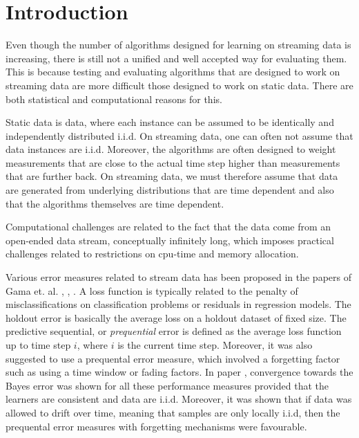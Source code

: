 \section{Introduction}

Even though the number of algorithms designed for learning on streaming data is increasing, there is still not a unified and well accepted way for evaluating them.  This is because testing and evaluating algorithms that are designed to work on streaming data are more difficult those designed to work on static data.  There are both statistical and computational reasons for this.  

Static data is data, where each instance can be assumed to be identically and independently distributed i.i.d.  On streaming data, one can often not assume that data instances are i.i.d.  Moreover, the algorithms are often designed to weight measurements that are close to the actual time step higher than measurements that are further back.  On streaming data, we must therefore assume that data are generated from underlying distributions that are time dependent and also that the algorithms themselves are time dependent.  

Computational challenges are related to the fact that the data come from an open-ended data stream, conceptually infinitely long, which imposes practical challenges related to restrictions on cpu-time and memory allocation.  

Various error measures related to stream data has been proposed in the papers of Gama et. al. \cite{Gam09}, \cite{Gam09_2}, \cite{Gam12}.  A loss function is typically related to the penalty of misclassifications on classification problems or residuals in regression models.  The holdout error is basically the average loss on a holdout dataset of fixed size.  The predictive sequential, or \emph{prequential} error is defined as the average loss function up to time step $i$, where $i$ is the current time step.  Moreover, it was also suggested to use a prequental error measure, which involved a forgetting factor such as using a time window or fading factors.  In paper \cite{Gam12}, convergence towards the Bayes error was shown for all these performance measures provided that the learners are consistent and data are i.i.d.  Moreover, it was shown that if data was allowed to drift over time, meaning that samples are only locally i.i.d, then the prequental error measures with forgetting mechanisms were favourable.


